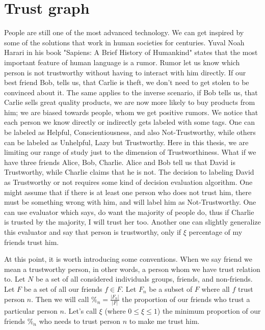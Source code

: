 \chapter{Trust graph}
\label{trust-graph}

People are still one of the most advanced technology. We can get inspired by some of the solutions that work in human societies for centuries.
Yuval Noah Harari in his book "Sapiens: A Brief History of Humankind" \cite{harari2014sapiens} states that the most important feature of human language is a rumor. Rumor let us know which person is not trustworthy without having to interact with him directly. If our best friend Bob, tells us, that Carlie is theft, we don't need to get stolen to be convinced about it. The same applies to the inverse scenario, if Bob tells us, that Carlie sells great quality products, we are now more likely to buy products from him; we are biased towards people, whom we get positive rumors. We notice that each person we know directly or indirectly gets labeled with some tags. One can be labeled as Helpful, Conscientiousness, and also Not-Trustworthy, while others can be labeled as Unhelpful, Lazy but Trustworthy. Here in this thesis, we are limiting our range of study just to the dimension of Trustworthiness.
What if we have three friends Alice, Bob, Charlie. Alice and  Bob tell us that David is Trustworthy, while Charlie claims that he is not. The decision to labeling David as Trustworthy or not requires some kind of decision evaluation algorithm.
One might assume that if there is at least one person who does not trust him, there must be something wrong with him, and will label him as Not-Trustworthy. One can use evaluator which says, do want the majority of people do, thus if Charlie is trusted by the majority, I will trust her too. Another one can slightly generalize this evaluator and say that person is trustworthy, only if $\xi$ percentage of my friends trust him. 

At this point, it is worth introducing some conventions. When we say friend we mean a trustworthy person, in other words, a person whom we have trust relation to. Let $N$ be a set of all considered individuals groups, friends, and non-friends. Let $F$ be a set of all our friends $f \in F$. Let $F_n$ be a subset of $F$ where all $f$ trust person $n$. Then we will call $\%_n = \frac{|F_n|}{|F|}$ the proportion of our friends who trust a particular person $n$. Let's call $\xi$ (where $0 \le \xi \leq 1$) the minimum proportion of our friends $\%_n$ who needs to trust person $n$ to make me trust him. 


